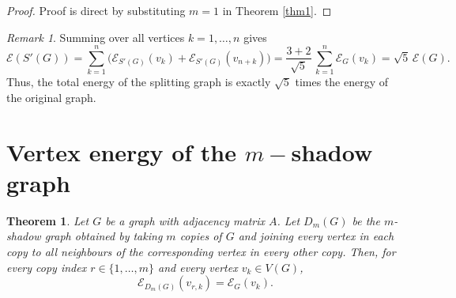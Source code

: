\documentclass[12pt]{article}
\theoremstyle{plain}
\newtheorem{theorem}{Theorem}
\theoremstyle{remark}
\newtheorem*{remark}{Remark}
\theoremstyle{definition}
\begin{document}
\begin{proof}
	Proof is direct by substituting $m=1$ in Theorem \ref{thm1}.
\end{proof} 
\begin{remark}
	Summing over all vertices $k=1,\dots,n$ gives
	$$\mathcal{E}(S'(G))
	=\sum_{k=1}^n\Big(\mathcal{E}_{S'(G)}(v_k)+\mathcal{E}_{S'(G)}(v_{n+k})\Big)
	=\frac{3+2}{\sqrt{5}}\,\sum_{k=1}^n \mathcal{E}_G(v_k)
	=\sqrt{5}\,\mathcal{E}(G).
	$$
	Thus, the total energy of the splitting graph is exactly $\sqrt{5}$ times the energy of the original graph.
\end{remark}

\section{Vertex energy of the $m-$shadow graph}
\begin{theorem}\label{thm:shadow}
	Let $G$ be a graph with adjacency matrix $A$. Let $D_m(G)$ be the $m$-shadow graph obtained by taking $m$ copies of $G$ and joining every vertex in each copy to all neighbours of the corresponding vertex in every other copy. Then, for every copy index $r\in\{1,\dots,m\}$ and every vertex $v_k\in V(G)$,
	\[
	\mathcal{E}_{D_m(G)}(v_{r,k})=\mathcal{E}_G(v_k).
	\]
\end{theorem}
\end{document}
